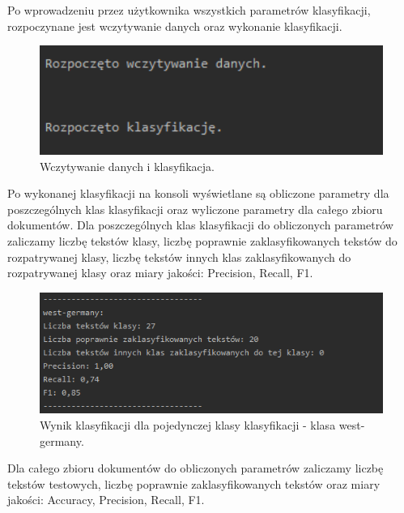\documentclass{classrep}
\begin{document}
\newpage
Po wprowadzeniu przez użytkownika wszystkich parametrów klasyfikacji, rozpoczynane jest wczytywanie danych oraz wykonanie klasyfikacji. 
\begin{figure}[h!]
 \centering
 \includegraphics[width=14cm]{srodek.png}
 \vspace{-0.3cm}
 \caption{Wczytywanie danych i klasyfikacja.}
 \label{Wczytywanie danych i klasyfikacja.}
\end{figure}




Po wykonanej klasyfikacji na konsoli wyświetlane są obliczone parametry dla poszczególnych klas klasyfikacji oraz wyliczone parametry dla całego zbioru dokumentów. Dla poszczególnych klas klasyfikacji do obliczonych parametrów zaliczamy liczbę tekstów klasy, liczbę poprawnie zaklasyfikowanych tekstów do rozpatrywanej klasy, liczbę tekstów innych klas zaklasyfikowanych do rozpatrywanej klasy oraz miary jakości: Precision, Recall, F1. 
\begin{figure}[h!]
 \centering
 \includegraphics[width=14cm]{wynik_dla _klasy.png}
 \vspace{-0.3cm}
 \caption{Wynik klasyfikacji dla pojedynczej klasy klasyfikacji - klasa west-germany.}
 \label{Wynik klasyfikacji.}
\end{figure}

Dla całego zbioru dokumentów do obliczonych parametrów zaliczamy liczbę tekstów testowych, liczbę poprawnie zaklasyfikowanych tekstów oraz miary jakości: Accuracy, Precision, Recall, F1. 
  
\end{document}
